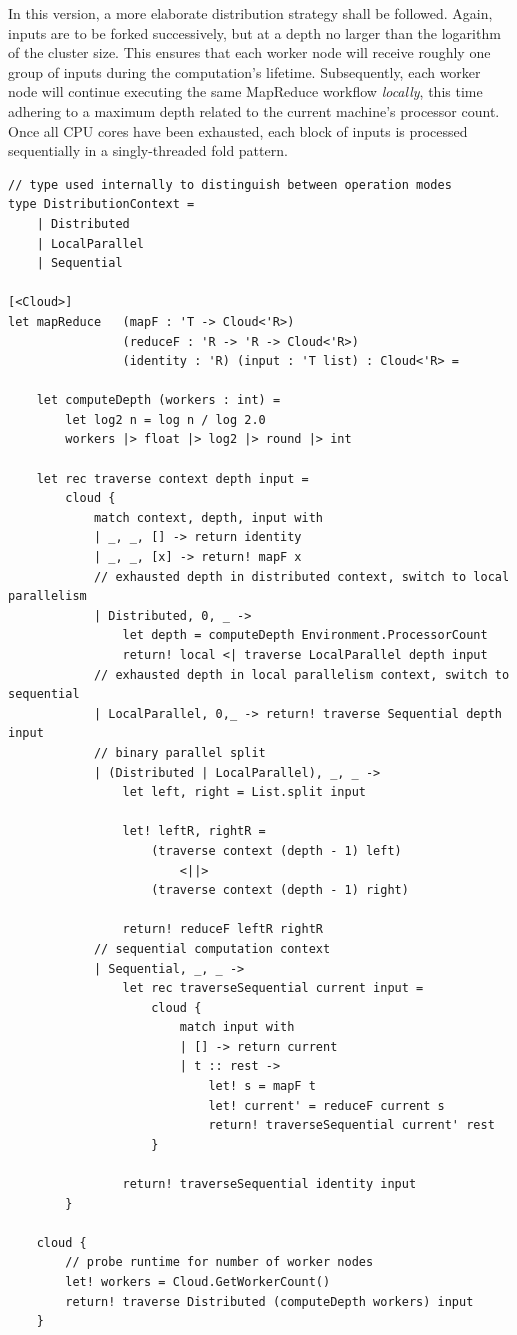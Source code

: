\documentclass[9pt,a4paper]{article}
\begin{document}
In this version, a more elaborate distribution strategy shall be followed.
Again, inputs are to be forked successively, but at a depth no larger than the logarithm
of the cluster size. This ensures that each worker node will receive roughly one group
of inputs during the computation's lifetime. Subsequently, each worker node will continue
executing the same MapReduce workflow \emph{locally}, this time adhering to a maximum 
depth related to the current machine's processor count. Once all CPU cores have been
exhausted, each block of inputs is processed sequentially in a singly-threaded fold pattern.
\begin{lstlisting}
// type used internally to distinguish between operation modes
type DistributionContext =
    | Distributed
    | LocalParallel
    | Sequential

[<Cloud>]
let mapReduce   (mapF : 'T -> Cloud<'R>)
                (reduceF : 'R -> 'R -> Cloud<'R>)
                (identity : 'R) (input : 'T list) : Cloud<'R> =

    let computeDepth (workers : int) = 
        let log2 n = log n / log 2.0
        workers |> float |> log2 |> round |> int
 
    let rec traverse context depth input =
        cloud {
            match context, depth, input with
            | _, _, [] -> return identity
            | _, _, [x] -> return! mapF x
            // exhausted depth in distributed context, switch to local parallelism
            | Distributed, 0, _ ->
                let depth = computeDepth Environment.ProcessorCount
                return! local <| traverse LocalParallel depth input
            // exhausted depth in local parallelism context, switch to sequential
            | LocalParallel, 0,_ -> return! traverse Sequential depth input
            // binary parallel split
            | (Distributed | LocalParallel), _, _ ->
                let left, right = List.split input

                let! leftR, rightR = 
                    (traverse context (depth - 1) left) 
                        <||> 
                    (traverse context (depth - 1) right)

                return! reduceF leftR rightR
            // sequential computation context
            | Sequential, _, _ ->
                let rec traverseSequential current input =
                    cloud {
                        match input with
                        | [] -> return current
                        | t :: rest ->
                            let! s = mapF t
                            let! current' = reduceF current s
                            return! traverseSequential current' rest
                    }

                return! traverseSequential identity input
        }

    cloud {
        // probe runtime for number of worker nodes
        let! workers = Cloud.GetWorkerCount()
        return! traverse Distributed (computeDepth workers) input
    }
\end{lstlisting}
\end{document}
